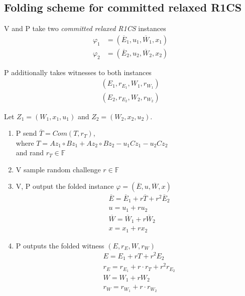\documentclass{article}
\theoremstyle{definition}
\begin{document}
\subsection{Folding scheme for committed relaxed R1CS}

V and P take two \emph{committed relaxed R1CS} instances
\begin{align*}
	\varphi_1&=(\overline{E}_1, u_1, \overline{W}_1, x_1)\\
	\varphi_2&=(\overline{E}_2, u_2, \overline{W}_2, x_2)
\end{align*}

P additionally takes witnesses to both instances
\begin{align*}
	(E_1, r_{E_1}, W_1, r_{W_1})\\
	(E_2, r_{E_2}, W_2, r_{W_2})
\end{align*}

Let $Z_1 = (W_1, x_1, u_1)$ and $Z_2 = (W_2, x_2, u_2)$.

\begin{enumerate}
	\item P send $\overline{T} = Com(T, r_T)$,\\
		where $T=A z_1 \circ B z_1 + A z_2 \circ B z_2 - u_1 C z_1 - u_2 C z_2$\\
		and rand $r_T \in \mathbb{F}$
	\item V sample random challenge $r \in \mathbb{F}$
	\item V, P output the folded instance $\varphi = (\overline{E}, u, \overline{W}, x)$
		\begin{align*}
			&\overline{E}=\overline{E}_1 + r \overline{T} + r^2 \overline{E}_2\\
			&u = u_1 + r u_2\\
			&\overline{W} = \overline{W}_1 + r \overline{W}_2\\
			&x = x_1 + r x_2
		\end{align*}
	\item P outputs the folded witness $(E, r_E, W, r_W)$
		\begin{align*}
			&E = E_1 + r T + r^2 E_2\\
			&r_E = r_{E_1} + r \cdot r_T + r^2 r_{E_2}\\
			&W=W_1 + r W_2\\
			&r_W = r_{W_1} + r \cdot r_{W_2}
		\end{align*}
\end{enumerate}
\end{document}

